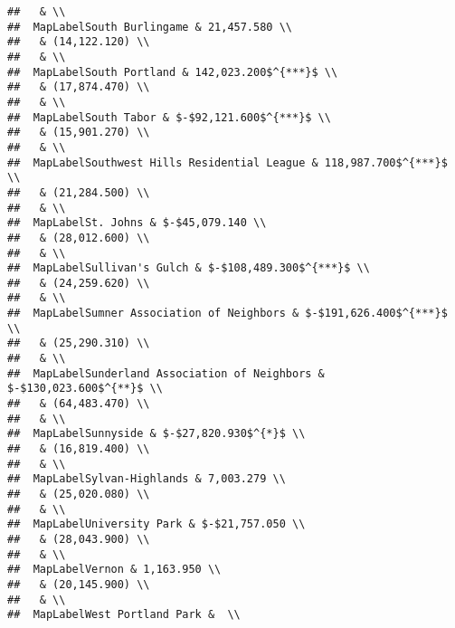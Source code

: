 \documentclass[]{article}
\begin{document}
\begin{verbatim}
##   & \\ 
##  MapLabelSouth Burlingame & 21,457.580 \\ 
##   & (14,122.120) \\ 
##   & \\ 
##  MapLabelSouth Portland & 142,023.200$^{***}$ \\ 
##   & (17,874.470) \\ 
##   & \\ 
##  MapLabelSouth Tabor & $-$92,121.600$^{***}$ \\ 
##   & (15,901.270) \\ 
##   & \\ 
##  MapLabelSouthwest Hills Residential League & 118,987.700$^{***}$ \\ 
##   & (21,284.500) \\ 
##   & \\ 
##  MapLabelSt. Johns & $-$45,079.140 \\ 
##   & (28,012.600) \\ 
##   & \\ 
##  MapLabelSullivan's Gulch & $-$108,489.300$^{***}$ \\ 
##   & (24,259.620) \\ 
##   & \\ 
##  MapLabelSumner Association of Neighbors & $-$191,626.400$^{***}$ \\ 
##   & (25,290.310) \\ 
##   & \\ 
##  MapLabelSunderland Association of Neighbors & $-$130,023.600$^{**}$ \\ 
##   & (64,483.470) \\ 
##   & \\ 
##  MapLabelSunnyside & $-$27,820.930$^{*}$ \\ 
##   & (16,819.400) \\ 
##   & \\ 
##  MapLabelSylvan-Highlands & 7,003.279 \\ 
##   & (25,020.080) \\ 
##   & \\ 
##  MapLabelUniversity Park & $-$21,757.050 \\ 
##   & (28,043.900) \\ 
##   & \\ 
##  MapLabelVernon & 1,163.950 \\ 
##   & (20,145.900) \\ 
##   & \\ 
##  MapLabelWest Portland Park &  \\ 

\end{verbatim}
\end{document}
